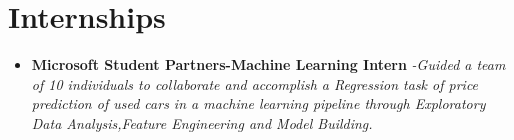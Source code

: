 \documentclass{article}
\begin{document}
\section*{Internships}
\begin{itemize}
    \item{\textbf{\large{Microsoft Student Partners-Machine Learning Intern}}}
          \newline
          \textit{-Guided a team of 10 individuals to collaborate and accomplish a Regression task of price prediction of used cars in a machine learning pipeline through Exploratory Data Analysis,Feature Engineering and Model Building.}
\end{itemize}
\end{document}
